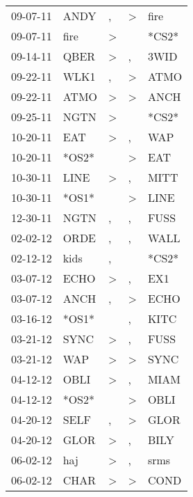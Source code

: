 \begin{supertabular}{lllll}
 09-07-11 &   ANDY &                , &     \textgreater &   fire \\
 09-07-11 &   fire &     \textgreater &                  &  *CS2* \\
 09-14-11 &   QBER &     \textgreater &                , &   3WID \\
 09-22-11 &   WLK1 &                , &     \textgreater &   ATMO \\
 09-22-11 &   ATMO &     \textgreater &     \textgreater &   ANCH \\
 09-25-11 &   NGTN &     \textgreater &                  &  *CS2* \\
 10-20-11 &    EAT &     \textgreater &                , &    WAP \\
 10-20-11 &  *OS2* &                  &     \textgreater &    EAT \\
 10-30-11 &   LINE &     \textgreater &                , &   MITT \\
 10-30-11 &  *OS1* &                  &     \textgreater &   LINE \\
 12-30-11 &   NGTN &                , &                , &   FUSS \\
 02-02-12 &   ORDE &                , &                , &   WALL \\
 02-12-12 &   kids &                , &                  &  *CS2* \\
 03-07-12 &   ECHO &     \textgreater &                , &    EX1 \\
 03-07-12 &   ANCH &                , &     \textgreater &   ECHO \\
 03-16-12 &  *OS1* &                  &                , &   KITC \\
 03-21-12 &   SYNC &     \textgreater &                , &   FUSS \\
 03-21-12 &    WAP &     \textgreater &     \textgreater &   SYNC \\
 04-12-12 &   OBLI &     \textgreater &                , &   MIAM \\
 04-12-12 &  *OS2* &                  &     \textgreater &   OBLI \\
 04-20-12 &   SELF &                , &     \textgreater &   GLOR \\
 04-20-12 &   GLOR &     \textgreater &                , &   BILY \\
 06-02-12 &    haj &     \textgreater &                , &   srms \\
 06-02-12 &   CHAR &     \textgreater &     \textgreater &   COND \\

\end{supertabular}
